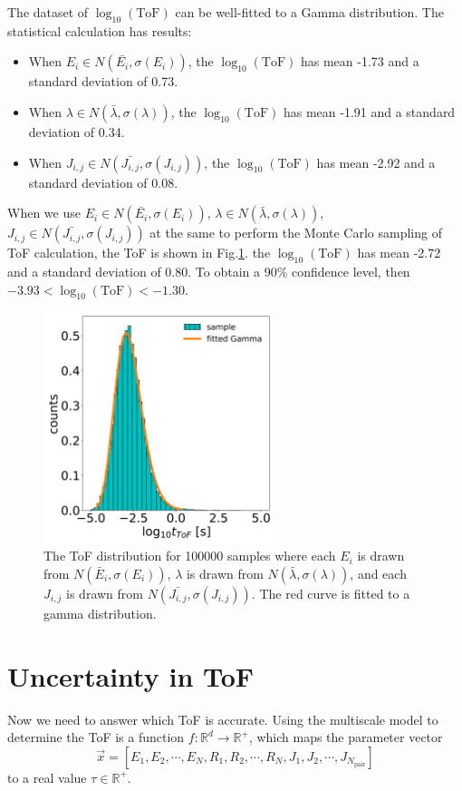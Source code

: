 \documentclass[letterpaper,12pt]{article}
\begin{document}
The dataset of $\log_{10}(\text{ToF})$ can be well-fitted to a Gamma distribution. 
The statistical calculation has results:
\begin{itemize}
    \item When $E_i \in N(\bar{E_i},\sigma(E_i))$, the $\log_{10}(\text{ToF})$ has mean -1.73 and a standard deviation of 0.73.
    \item When $\lambda \in N(\bar{\lambda},\sigma(\lambda))$, the $\log_{10}(\text{ToF})$ has mean -1.91 and a standard deviation of 0.34.
    \item When $J_{i,j} \in N(\bar{J_{i,j}},\sigma(J_{i,j}))$, the $\log_{10}(\text{ToF})$ has mean -2.92 and a standard deviation of 0.08.
\end{itemize}

When we use $E_i \in N(\bar{E_i},\sigma(E_i))$, $\lambda \in N(\bar{\lambda},\sigma(\lambda))$, $J_{i,j} \in N(\bar{J_{i,j}},\sigma(J_{i,j}))$ at the same to perform the Monte Carlo sampling of ToF calculation, the ToF is shown in Fig.\ref{fig:ToFs2}. the $\log_{10}(\text{ToF})$ has mean -2.72 and a standard deviation of 0.80. To obtain a 90\% confidence level, then $-3.93 < \log_{10}(\text{ToF}) < -1.30$.
\begin{figure}
    \centering
    \includegraphics[width=0.6\textwidth]{figs/fig_mle2.png}
    \caption{The ToF distribution for 100000 samples where each $E_i$ is drawn from $N(\bar{E}_i,\sigma(E_i))$, $\lambda$ is drawn from $N(\bar{\lambda},\sigma(\lambda))$, and each $J_{i,j}$ is drawn from $N(\bar{J_{i,j}},\sigma(J_{i,j}))$. The red curve is fitted to a gamma distribution.}
    \label{fig:ToFs2}
\end{figure} 

\section{Uncertainty in ToF}
Now we need to answer which ToF is accurate. 
Using the multiscale model to determine the ToF is a function $f: \mathbb{R}^d \rightarrow \mathbb{R}^+$, which maps the parameter vector $$\vec{x} = [ E_1,E_2,\cdots,E_N, R_1,R_2,\cdots,R_N,J_1,J_2,\cdots,J_{N_\text{pair}} ]$$ to a real value $\tau \in \mathbb{R}^+$.
\end{document}
